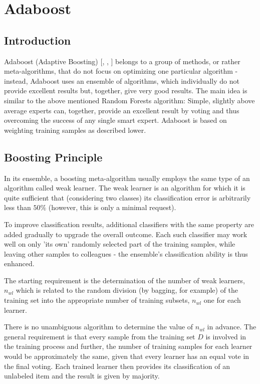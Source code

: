 \chapter{Adaboost}

\section{Introduction}

Adaboost (Adaptive Boosting) [\cite{ref94}, \cite{ref95}, \cite{ref112}] belongs to a group of methods, or rather meta-algorithms, that do not focus on optimizing one particular algorithm - instead, Adaboost uses an ensemble of algorithms, which individually do not provide excellent results but, together, give very good results. The main idea is similar to the above mentioned Random Forests algorithm: Simple, slightly above average experts can, together, provide an excellent result by voting and thus overcoming the success of any single smart expert. Adaboost is based on weighting training samples as described lower.

\section{Boosting Principle}
In its ensemble, a boosting meta-algorithm usually employs the same type of an algorithm called weak learner. The weak learner is an algorithm for which it is quite sufficient that (considering two classes) its classification error is arbitrarily less than $50 \%$ (however, this is only a minimal request).

To improve classification results, additional classifiers with the same property are added gradually to upgrade the overall outcome. Each such classifier may work well on only 'its own' randomly selected part of the training samples, while leaving other samples to colleagues - the ensemble's classification ability is thus enhanced.

The starting requirement is the determination of the number of weak learners, $n_{w l}$ which is related to the random division (by bagging, for example) of the\\
training set into the appropriate number of training subsets, $n_{w l}$ one for each learner.

There is no unambiguous algorithm to determine the value of $n_{w l}$ in advance. The general requirement is that every sample from the training set $D$ is involved in the training process and further, the number of training samples for each learner would be approximately the same, given that every learner has an equal vote in the final voting. Each trained learner then provides its classification of an unlabeled item and the result is given by majority.


